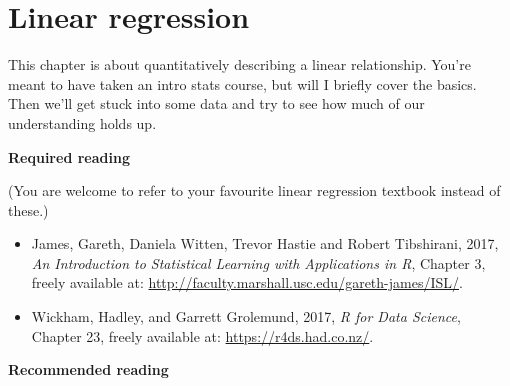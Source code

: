 \documentclass[
]{book}
\providecommand{\tightlist}{%
  \setlength{\itemsep}{0pt}\setlength{\parskip}{0pt}}
\begin{document}
\hypertarget{linear-regression}{%
\section{Linear regression}\label{linear-regression}}

This chapter is about quantitatively describing a linear relationship. You're meant to have taken an intro stats course, but will I briefly cover the basics. Then we'll get stuck into some data and try to see how much of our understanding holds up.

\textbf{Required reading}

(You are welcome to refer to your favourite linear regression textbook instead of these.)

\begin{itemize}
\tightlist
\item
  James, Gareth, Daniela Witten, Trevor Hastie and Robert Tibshirani, 2017, \emph{An Introduction to Statistical Learning with Applications in R}, Chapter 3, freely available at: \url{http://faculty.marshall.usc.edu/gareth-james/ISL/}.
\item
  Wickham, Hadley, and Garrett Grolemund, 2017, \emph{R for Data Science}, Chapter 23, freely available at: \url{https://r4ds.had.co.nz/}.
\end{itemize}

\textbf{Recommended reading}
\end{document}
